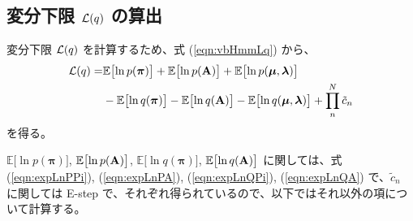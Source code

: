 \subsection{ 変分下限 ${\cal L}(q)$ の算出 }

変分下限 ${\cal L}(q)$ を計算するため、式 (\ref{eqn:vbHmmLq}) から、
\begin{align}
  {\cal L}(q)  = &  \mathbb{E}\bigl[\ln p({\boldsymbol \pi}) \bigr] + \mathbb{E}\bigl[\ln p({\bf A}) \bigr] + \mathbb{E}\bigl[\ln p({\boldsymbol \mu}, {\boldsymbol \lambda}) \bigr]   \notag  \\
  &  - \mathbb{E}\bigl[\ln q({\boldsymbol \pi}) \bigr] - \mathbb{E}\bigl[\ln q({\bf A}) \bigr] - \mathbb{E}\bigl[\ln q({\boldsymbol \mu}, {\boldsymbol \lambda}) \bigr] + \prod_n^N \tilde{c}_n  
\end{align}
を得る。

$\mathbb{E}\bigl[\ln p({\boldsymbol \pi})\bigr]$, $\mathbb{E}\bigl[\ln p({\bf A})\bigr]$, $\mathbb{E}\bigl[\ln q({\boldsymbol \pi})\bigr]$, $\mathbb{E}\bigl[\ln q({\bf A}) \bigr]$ に関しては、式 (\ref{eqn:expLnPPi}), (\ref{eqn:expLnPA}), (\ref{eqn:expLnQPi}), (\ref{eqn:expLnQA}) で、$\tilde{c}_n$ に関しては E-step で、それぞれ得られているので、以下ではそれ以外の項について計算する。


